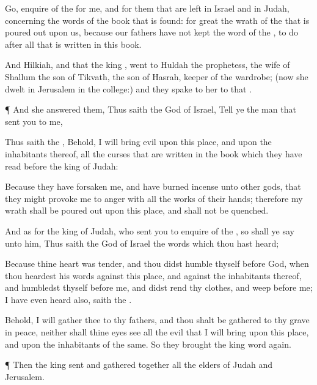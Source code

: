 {Go,
enquire of the
{} for me, and for them that are
left in
Israel and in
Judah, concerning the
words of the
book that is
found: for
great
{} the
wrath of the
{} that is poured
out upon us, because our
fathers have not
kept the
word of the
{}, to
do after all that is
written in this
book.

And
Hilkiah, and
{} that the
king
{},
went to
Huldah the
prophetess, the
wife of
Shallum the
son of
Tikvath, the
son of
Hasrah,
keeper of the
wardrobe; (now she
dwelt in
Jerusalem in the
college:) and they
spake to her to that
{}.


\par }{\PP {}¶ And she
answered them, Thus
saith the
{}
God of
Israel,
Tell ye the
man that
sent you to me,

Thus
saith the
{}, Behold, I will
bring
evil upon this
place, and upon the
inhabitants thereof,
{} all the
curses that are
written in the
book which they have
read
before the
king of
Judah:

Because they have
forsaken me, and have burned
incense unto
other
gods, that they might provoke me to
anger with all the
works of their
hands; therefore my
wrath shall be poured
out upon this
place, and shall not be
quenched.

And as
for the
king of
Judah, who
sent you to
enquire of the
{}, so shall ye
say unto him, Thus
saith the
{}
God of
Israel
{} the
words which thou hast
heard;

Because thine
heart was
tender, and thou didst
humble thyself
before
God, when thou
heardest his
words against this
place, and against the
inhabitants thereof, and
humbledst thyself
before me, and didst
rend thy
clothes, and
weep
before me; I have even
heard
{} also,
saith the
{}.

Behold, I will
gather thee to thy
fathers, and thou shalt be
gathered to thy
grave in
peace, neither shall thine
eyes
see all the
evil that I will
bring upon this
place, and upon the
inhabitants of the same. So they
brought the
king
word
again.


\par }{\PP {}¶ Then the
king
sent and gathered
together all the
elders of
Judah and
Jerusalem.

}
